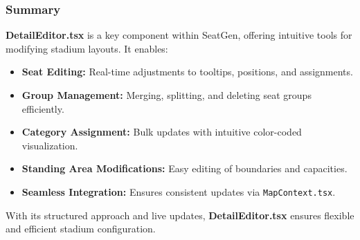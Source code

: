 \subsubsection{Summary}
\textbf{DetailEditor.tsx} is a key component within SeatGen, offering intuitive tools for modifying stadium layouts. It enables:
\begin{itemize}
    \item \textbf{Seat Editing:} Real-time adjustments to tooltips, positions, and assignments.
    \item \textbf{Group Management:} Merging, splitting, and deleting seat groups efficiently.
    \item \textbf{Category Assignment:} Bulk updates with intuitive color-coded visualization.
    \item \textbf{Standing Area Modifications:} Easy editing of boundaries and capacities.
    \item \textbf{Seamless Integration:} Ensures consistent updates via \texttt{MapContext.tsx}.
\end{itemize}

With its structured approach and live updates, \textbf{DetailEditor.tsx} ensures flexible and efficient stadium configuration.
